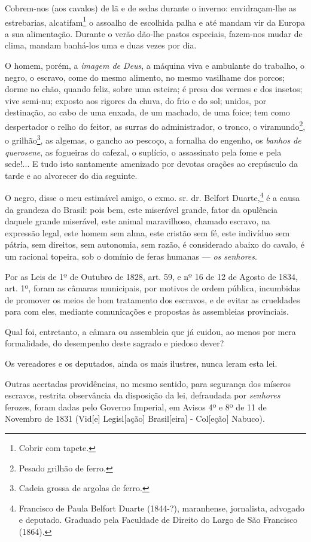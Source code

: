 Cobrem-nos (aos cavalos) de lã e de sedas durante o inverno:
envidraçam-lhe as estrebarias, alcatifam\footnote{Cobrir com tapete.}
o assoalho de escolhida palha e até mandam vir da Europa a sua
alimentação. Durante o verão dão-lhe pastos especiais, fazem-nos mudar
de clima, mandam banhá-los uma e duas vezes por dia.

O homem, porém, a \emph{imagem de Deus}, a máquina viva e ambulante do
trabalho, o negro, o escravo, come do mesmo alimento, no mesmo vasilhame
dos porcos; dorme no chão, quando feliz, sobre uma esteira; é presa dos
vermes e dos insetos; vive semi-nu; exposto aos rigores da chuva, do
frio e do sol; unidos, por destinação, ao cabo de uma enxada, de um
machado, de uma foice; tem como despertador o relho do feitor, as surras
do administrador, o tronco, o viramundo\footnote{Pesado grilhão de
  ferro.}, o grilhão\footnote{Cadeia grossa de argolas de ferro.}, as
algemas, o gancho ao pescoço, a fornalha do engenho, os \emph{banhos de
querosene}, as fogueiras do cafezal, o suplício, o assassinato pela fome
e pela sede!... E tudo isto santamente amenizado por devotas orações ao
crepúsculo da tarde e ao alvorecer do dia seguinte.

O negro, disse o meu estimável amigo, o exmo. sr. dr. Belfort
Duarte,\footnote{Francisco de Paula Belfort Duarte (1844-?),
  maranhense, jornalista, advogado e deputado. Graduado pela Faculdade
  de Direito do Largo de São Francisco (1864).} é a causa da grandeza do
Brasil: pois bem, este miserável grande, fator da opulência daquele
grande miserável, este animal maravilhoso, chamado escravo, na expressão
legal, este homem sem alma, este cristão sem fé, este indivíduo sem
pátria, sem direitos, sem autonomia, sem razão, é considerado abaixo do
cavalo, é um racional topeira, sob o domínio de feras humanas ---
\emph{os senhores}.

Por as Leis de 1º de Outubro de 1828, art. 59, e nº 16 de 12 de Agosto
de 1834, art. 1º, foram as câmaras municipais, por motivos de ordem
pública, incumbidas de promover os meios de bom tratamento dos escravos,
e de evitar as crueldades para com eles, mediante comunicações e
propostas às assembleias provinciais.

Qual foi, entretanto, a câmara ou assembleia que já cuidou, ao menos por
mera formalidade, do desempenho deste sagrado e piedoso dever?

Os vereadores e os deputados, ainda os mais ilustres, nunca leram esta
lei.

Outras acertadas providências, no mesmo sentido, para segurança dos
míseros escravos, restrita observância da disposição da lei, defraudada
por \emph{senhores} ferozes, foram dadas pelo Governo Imperial, em
Avisos 4º e 8º de 11 de Novembro de 1831 (Vid{[}e{]} Legisl{[}ação{]}
Brasil{[}eira{]} - Col{[}eção{]} Nabuco).

